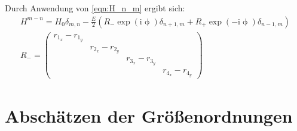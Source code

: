 Durch Anwendung von \eqref{eqn:H_n_m} ergibt sich:
\begin{align}
  H^{m-n}=H_0\delta_{m,n} -\frac{E}{2}\left(R_{-} \exp\left( \mathrm{i}\upphi\right)\delta_{n+1,m}   +  R_{+}\exp\left( -\mathrm{i}\upphi\right)\delta_{n-1,m}\right)\\
  R_{-}=
\begin{pmatrix}
  r_{1_x}-r_{1_y}& & & \\
  &r_{2_x}-r_{2_y} & & \\
  & & r_{3_x}-r_{3_y}& \\
  & & & r_{4_x}-r_{4_y}
\end{pmatrix}
\end{align}

\section{Abschätzen der Größenordnungen}
